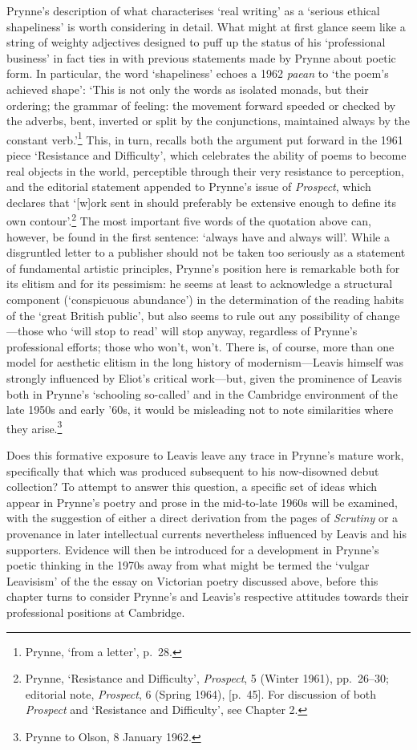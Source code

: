 \documentclass[]{article}
\begin{document}
Prynne’s description of what characterises ‘real writing’ as a ‘serious
ethical shapeliness’ is worth considering in detail. What might at first
glance seem like a string of weighty adjectives designed to puff up the
status of his ‘professional business’ in fact ties in with previous
statements made by Prynne about poetic form. In particular, the word
‘shapeliness’ echoes a 1962 \emph{paean} to ‘the poem’s achieved shape’:
‘This is not only the words as isolated monads, but their ordering; the
grammar of feeling: the movement forward speeded or checked by the
adverbs, bent, inverted or split by the conjunctions, maintained always
by the constant verb.’\footnote{Prynne, ‘from a letter’, p.~28.} This,
in turn, recalls both the argument put forward in the 1961 piece
‘Resistance and Difficulty’, which celebrates the ability of poems to
become real objects in the world, perceptible through their very
resistance to perception, and the editorial statement appended to
Prynne’s issue of \emph{Prospect}, which declares that ‘{[}w{]}ork sent
in should preferably be extensive enough to define its own
contour’.\footnote{Prynne, ‘Resistance and Difficulty’, \emph{Prospect},
  5 (Winter 1961), pp.~26–30; editorial note, \emph{Prospect}, 6 (Spring
  1964), {[}p.~45{]}. For discussion of both \emph{Prospect} and
  ‘Resistance and Difficulty’, see Chapter 2.} The most important five
words of the quotation above can, however, be found in the first
sentence: ‘always have and always will’. While a disgruntled letter to a
publisher should not be taken too seriously as a statement of
fundamental artistic principles, Prynne’s position here is remarkable
both for its elitism and for its pessimism: he seems at least to
acknowledge a structural component (‘conspicuous abundance’) in the
determination of the reading habits of the ‘great British public’, but
also seems to rule out any possibility of change—those who ‘will stop to
read’ will stop anyway, regardless of Prynne’s professional efforts;
those who won’t, won’t. There is, of course, more than one model for
aesthetic elitism in the long history of modernism—Leavis himself was
strongly influenced by Eliot’s critical work—but, given the prominence
of Leavis both in Prynne’s ‘schooling so-called’ and in the Cambridge
environment of the late 1950s and early ’60s, it would be misleading not
to note similarities where they arise.\footnote{Prynne to Olson, 8
  January 1962.}

Does this formative exposure to Leavis leave any trace in Prynne’s
mature work, specifically that which was produced subsequent to his
now-disowned debut collection? To attempt to answer this question, a
specific set of ideas which appear in Prynne’s poetry and prose in the
mid-to-late 1960s will be examined, with the suggestion of either a
direct derivation from the pages of \emph{Scrutiny} or a provenance in
later intellectual currents nevertheless influenced by Leavis and his
supporters. Evidence will then be introduced for a development in
Prynne’s poetic thinking in the 1970s away from what might be termed the
‘vulgar Leavisism’ of the the essay on Victorian poetry discussed above,
before this chapter turns to consider Prynne’s and Leavis’s respective
attitudes towards their professional positions at Cambridge.
\end{document}
